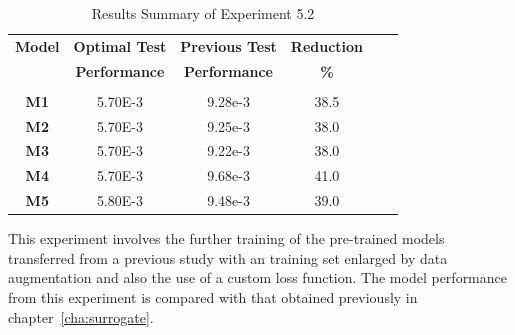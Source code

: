 \begin{table}[h!]
	 \begin{center}
		
		\begin{tabular}{c|c|c|c|c|c|} %
			\textbf{Model} & \textbf{Optimal Test} & \textbf{Previous Test} & \textbf{Reduction} \\
			
			\textbf{} & \textbf{Performance} & \textbf{Performance} & \textbf{\%} \\
			
			\hline
			& & & \\
			\textbf{M1} & 5.70E-3 & 9.28e-3 & 38.5 \\
			\textbf{M2} & 5.70E-3 & 9.25e-3 & 38.0\\
			\textbf{M3} & 5.70E-3 & 9.22e-3 & 38.0\\
			\textbf{M4} & 5.70E-3 & 9.68e-3 & 41.0\\
			\textbf{M5} & 5.80E-3 & 9.48e-3 & 39.0 \\
			
			
		\end{tabular}
		\caption{Results Summary of Experiment 5.2} {This experiment involves the further training of the pre-trained models transferred from a previous study with an training set enlarged by data augmentation and also the use of a custom loss function. The model performance from this experiment is compared with that obtained previously in chapter~\ref{cha:surrogate}. }
		\label{tab:Experiment5p2results}
		 \end{center}
\end{table}

